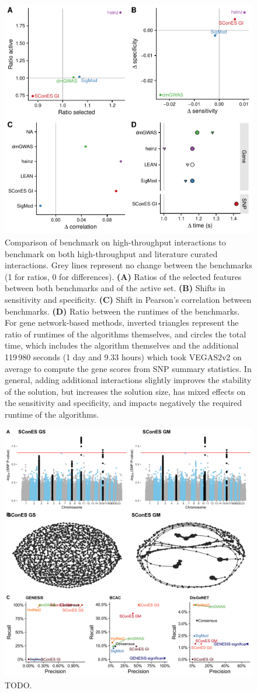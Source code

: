 \documentclass[twocolumn, 11pt, draft]{article}
\begin{document}
\begin{figure}[htbp]
\centering
\includegraphics[width=.9\linewidth]{./figures/sfigure_7.pdf}
\caption{\label{sfig:lc_ht_comparison}
Comparison of benchmark on high-throughput interactions to benchmark on both high-throughput and literature curated interactions. Grey lines represent no change between the benchmarks (1 for ratios, 0 for differences). \textbf{(A)} Ratios of the selected features between both benchmarks and of the active set. \textbf{(B)} Shifts in sensitivity and specificity. \textbf{(C)} Shift in Pearson's correlation between benchmarks. \textbf{(D)} Ratio between the runtimes of the benchmarks. For gene network-based methods, inverted triangles represent the ratio of runtimes of the algorithms themselves, and circles the total time, which includes the algorithm themselves and the additional 119\,980 seconds (1 day and 9.33 hours) which took VEGAS2v2 on average to compute the gene scores from SNP summary statistics. In general, adding additional interactions slightly improves the stability of the solution, but increases the solution size, has mixed effects on the sensitivity and specificity, and impacts negatively the required runtime of the algorithms.}
\end{figure}

\begin{figure}[htbp]
  \centering
  \includegraphics[width=.9\linewidth]{./figures/sfigure_8.png}
  \caption{\label{sfig:scones_gsm} TODO.}
\end{figure}
\end{document}
